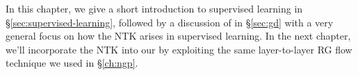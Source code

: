 In this chapter, we give a short introduction to supervised learning in \S\ref{sec:supervised-learning}, followed by a discussion of  in \S\ref{sec:gd} with a very general focus on how the NTK arises in supervised learning. In the next chapter, we'll incorporate the NTK into our  by exploiting the same layer-to-layer RG flow technique we used in \S\ref{ch:ngp}. %
































 
































